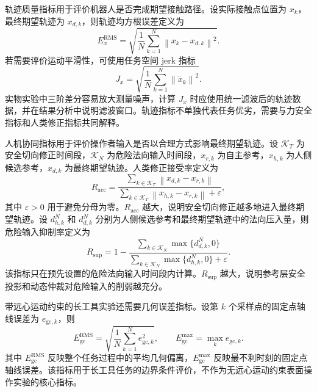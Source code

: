 轨迹质量指标用于评价机器人是否完成期望接触路径。设实际接触点位置为 $x_k$，最终期望轨迹为 $x_{d,k}$，则轨迹均方根误差定义为
\begin{equation}
  E_x^{\mathrm{RMS}}=
  \sqrt{\frac{1}{N}\sum_{k=1}^{N}\left\|x_k-x_{d,k}\right\|^2}.
  \label{eq:ch5_metric_position_rms}
\end{equation}
若需要评价运动平滑性，可使用任务空间 jerk 指标
\begin{equation}
  J_x=
  \sqrt{\frac{1}{N}\sum_{k=1}^{N}\left\|\dddot x_k\right\|^2}.
  \label{eq:ch5_metric_jerk}
\end{equation}
实物实验中三阶差分容易放大测量噪声，计算 $J_x$ 时应使用统一滤波后的轨迹数据，并在结果分析中说明滤波窗口。轨迹指标不单独代表任务优劣，需要与力安全指标和人类修正指标共同解释。

人机协同指标用于评价操作者输入是否以合理方式影响最终期望轨迹。设 $\mathcal K_T$ 为安全切向修正时间段，$\mathcal K_N$ 为危险法向输入时间段，$x_{r,k}$ 为自主参考，$x_{h,k}$ 为人侧候选参考，$x_{d,k}$ 为最终期望轨迹。人类修正接受率定义为
\begin{equation}
  R_{\mathrm{acc}}=
  \frac{\sum_{k\in\mathcal K_T}\left\|x_{d,k}-x_{r,k}\right\|}
  {\sum_{k\in\mathcal K_T}\left\|x_{h,k}-x_{r,k}\right\|+\varepsilon},
  \label{eq:ch5_metric_acceptance}
\end{equation}
其中 $\varepsilon>0$ 用于避免分母为零。$R_{\mathrm{acc}}$ 越大，说明安全切向修正越多地进入最终期望轨迹。设 $d_{h,k}^{N}$ 和 $d_{d,k}^{N}$ 分别为人侧候选参考和最终期望轨迹中的法向压入量，则危险输入抑制率定义为
\begin{equation}
  R_{\mathrm{sup}}=
  1-
  \frac{\sum_{k\in\mathcal K_N}\max\{d_{d,k}^{N},0\}}
  {\sum_{k\in\mathcal K_N}\max\{d_{h,k}^{N},0\}+\varepsilon}.
  \label{eq:ch5_metric_suppression}
\end{equation}
该指标只在预先设置的危险法向输入时间段内计算。$R_{\mathrm{sup}}$ 越大，说明参考层安全投影和动态仲裁对危险输入的削弱越充分。

带远心运动约束的长工具实验还需要几何误差指标。设第 $k$ 个采样点的固定点轴线误差为 $e_{\mathrm{gc},k}$，则
\begin{equation}
  E_{\mathrm{gc}}^{\mathrm{RMS}}=
  \sqrt{\frac{1}{N}\sum_{k=1}^{N}e_{\mathrm{gc},k}^{2}},
  \qquad
  E_{\mathrm{gc}}^{\max}=\max_{k}e_{\mathrm{gc},k}.
  \label{eq:ch5_metric_gc}
\end{equation}
其中 $E_{\mathrm{gc}}^{\mathrm{RMS}}$ 反映整个任务过程中的平均几何偏离，$E_{\mathrm{gc}}^{\max}$ 反映最不利时刻的固定点轴线误差。该指标用于长工具任务的边界条件评价，不作为无远心运动约束表面操作实验的核心指标。

